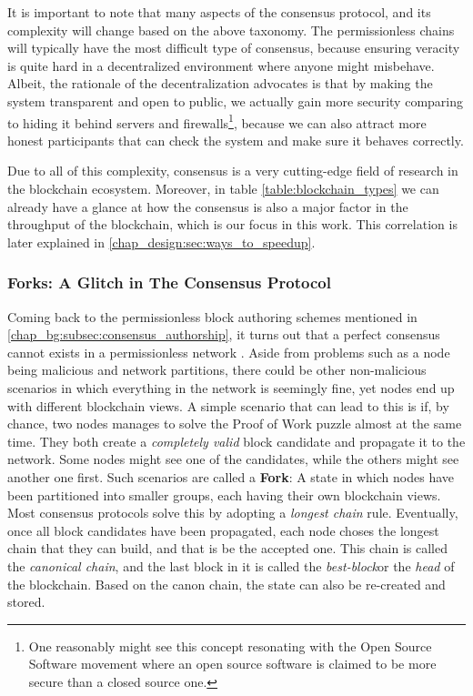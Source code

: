 It is important to note that many aspects of the consensus protocol, and its complexity will change
based on the above taxonomy. The permissionless chains will typically have the most difficult type
of consensus, because ensuring veracity is quite hard in a decentralized environment where anyone
might misbehave. Albeit, the rationale of the decentralization advocates is that by making the
system transparent and open to public, we actually gain more security comparing to hiding it behind
servers and firewalls\footnote{One reasonably might see this concept resonating with the Open Source
Software movement where an open source software is claimed to be more secure than a closed source
one.}, because we can also attract more honest participants that can check the system and make sure
it behaves correctly.

Due to all of this complexity, consensus is a very cutting-edge field of research in the blockchain
ecosystem. Moreover, in table \ref{table:blockchain_types} we can already have a glance at how the
consensus is also a major factor in the throughput of the blockchain, which is our focus in this
work. This correlation is later explained in \ref{chap_design:sec:ways_to_speedup}.

\subsubsection{Forks: A Glitch in The Consensus Protocol}

Coming back to the permissionless block authoring schemes mentioned in
\ref{chap_bg:subsec:consensus_authorship}, it turns out that a perfect consensus cannot exists in a
permissionless network \cite{wangSurveyConsensusMechanisms2019}. Aside from problems such as a node
being malicious and network partitions, there could be other non-malicious scenarios in which
everything in the network is seemingly fine, yet nodes end up with different blockchain views. A
simple scenario that can lead to this is if, by chance, two nodes manages to solve the Proof of Work
puzzle almost at the same time. They both create a \textit{completely valid} block candidate and
propagate it to the network. Some nodes might see one of the candidates, while the others might see
another one first. Such scenarios are called a \textbf{Fork}: A state in which nodes have been
partitioned into smaller groups, each having their own blockchain views. Most consensus protocols
solve this by adopting a \textit{longest chain} rule. Eventually, once all block candidates have
been propagated, each node choses the longest chain that they can build, and that is be the accepted
one. This chain is called the \textit{canonical chain}, and the last block in it is called the
\textit{best-block}or the \textit{head} of the blockchain. Based on the canon chain, the state can
also be re-created and stored.

